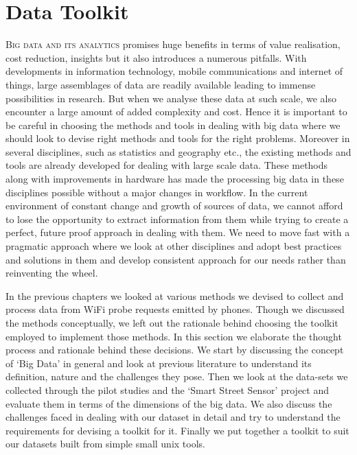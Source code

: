
\section{Data Toolkit}

\textsc{Big data and its analytics} promises huge benefits in terms of value realisation, cost reduction, insights but it also introduces a numerous pitfalls.
With developments in information technology, mobile communications and internet of things, large assemblages of data are readily available leading to immense possibilities in research.
But when we analyse these data at such scale, we also encounter a large amount of added complexity and cost.
Hence it is important to be careful in choosing the methods and tools in dealing with big data where we should look to devise right methods and tools for the right problems.
Moreover in several disciplines, such as statistics and geography etc., the existing methods and tools are already developed for dealing with large scale data.
These methods along with improvements in hardware has made the processing big data in these disciplines possible without a major changes in workflow.
In the current environment of constant change and growth of sources of data, we cannot afford to lose the opportunity to extract information from them while trying to create a perfect, future proof approach in dealing with them.
We need to move fast with a pragmatic approach where we look at other disciplines and adopt best practices and solutions in them and develop consistent approach for our needs rather than reinventing the wheel.

In the previous chapters we looked at various methods we devised to collect and process data from WiFi probe requests emitted by phones.
Though we discussed the methods conceptually, we left out the rationale behind choosing the toolkit employed to implement those methods.
In this section we elaborate the thought process and rationale behind these decisions.
We start by discussing the concept of `Big Data' in general and look at previous literature to understand its definition, nature and the challenges they pose.
Then we look at the data-sets we collected through the pilot studies and the `Smart Street Sensor' project and evaluate them in terms of the dimensions of the big data.
We also discuss the challenges faced in dealing with our dataset in detail and try to understand the requirements for devising a toolkit for it.
Finally we put together a toolkit to suit our datasets built from simple small unix tools.

